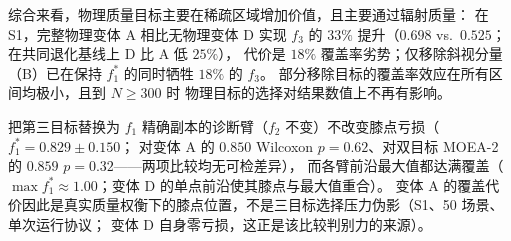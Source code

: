 综合来看，物理质量目标主要在稀疏区域增加价值，且主要通过辐射质量：
在 S1，完整物理变体 A 相比无物理变体 D 实现 $f_3$ 的 $33\%$ 提升（$0.698$ vs.\ $0.525$；在共同退化基线上 D 比 A 低 $25\%$），
代价是 $18\%$ 覆盖率劣势；仅移除斜视分量（B）已在保持 $f_1^*$ 的同时牺牲 $18\%$ 的 $f_3$。
部分移除目标的覆盖率效应在所有区间均极小，且到 $N \geq 300$ 时
物理目标的选择对结果数值上不再有影响。

把第三目标替换为 $f_1$ 精确副本的诊断臂（$f_2$ 不变）不改变膝点亏损（$f_1^* = 0.829 \pm 0.150$；
对变体 A 的 $0.850$ Wilcoxon $p=0.62$、对双目标 MOEA-2 的 $0.859$ $p=0.32$——两项比较均无可检差异），
而各臂前沿最大值都达满覆盖（$\max f_1^* \approx 1.00$；变体 D 的单点前沿使其膝点与最大值重合）。
变体 A 的覆盖代价因此是真实质量权衡下的膝点位置，不是三目标选择压力伪影（S1、50 场景、单次运行协议；
变体 D 自身零亏损，这正是该比较判别力的来源）。
